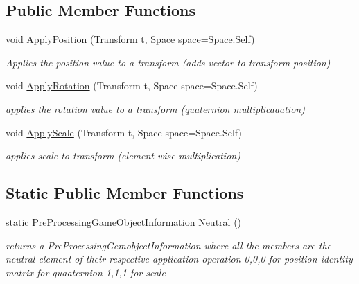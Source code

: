 \subsection*{Public Member Functions}
\begin{DoxyCompactItemize}
\item 
void \mbox{\hyperlink{class_pre_processing_game_object_information_af58318fffb0f07751dc2472fe7dce7ef}{Apply\+Position}} (Transform t, Space space=Space.\+Self)
\begin{DoxyCompactList}\small\item\em Applies the position value to a transform (adds vector to transform position) \end{DoxyCompactList}\item 
void \mbox{\hyperlink{class_pre_processing_game_object_information_af252abe53894e441edc39890a6196901}{Apply\+Rotation}} (Transform t, Space space=Space.\+Self)
\begin{DoxyCompactList}\small\item\em applies the rotation value to a transform (quaternion multiplicaaation) \end{DoxyCompactList}\item 
void \mbox{\hyperlink{class_pre_processing_game_object_information_ae5ce78a8438afe10ba171442ea863c00}{Apply\+Scale}} (Transform t, Space space=Space.\+Self)
\begin{DoxyCompactList}\small\item\em applies scale to transform (element wise multiplication) \end{DoxyCompactList}\end{DoxyCompactItemize}
\subsection*{Static Public Member Functions}
\begin{DoxyCompactItemize}
\item 
static \mbox{\hyperlink{class_pre_processing_game_object_information}{Pre\+Processing\+Game\+Object\+Information}} \mbox{\hyperlink{class_pre_processing_game_object_information_aec5a374a598a20e933424c6891ed5d99}{Neutral}} ()
\begin{DoxyCompactList}\small\item\em returns a Pre\+Processing\+Gemobject\+Information where all the members are the neutral element of their respective application operation 0,0,0 for position identity matrix for quaaternion 1,1,1 for scale \end{DoxyCompactList}\end{DoxyCompactItemize}
